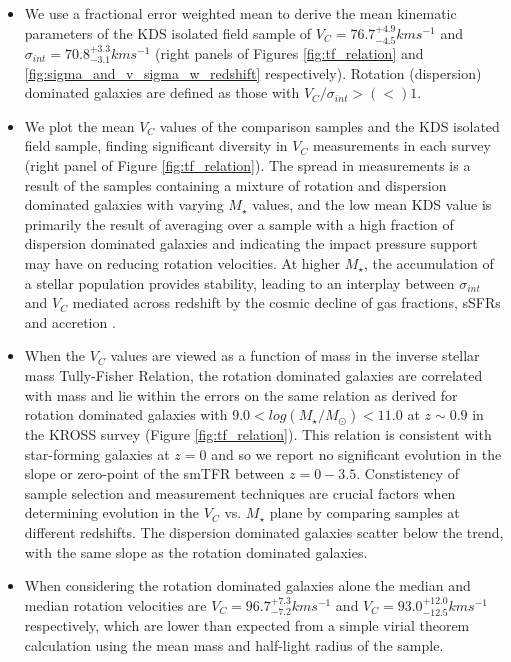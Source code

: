 \documentclass[fleqn,usenatbib]{mn2e}
\begin{document}
\begin{itemize}
    \item We use a fractional error weighted mean to derive the mean kinematic parameters of the KDS isolated field sample of $V_{C} = 76.7^{+4.9}_{-4.5}kms^{-1}$ and $\sigma_{int} = 70.8^{+3.3}_{-3.1} kms^{-1}$ (right panels of Figures \ref{fig:tf_relation} and \ref{fig:sigma_and_v_sigma_w_redshift} respectively).
    Rotation (dispersion) dominated galaxies are defined as those with $V_{C}/\sigma_{int} > (<) 1$.  
    \item We plot the mean $V_{C}$ values of the comparison samples and the KDS isolated field sample, finding significant diversity in $V_{C}$ measurements in each survey (right panel of Figure \ref{fig:tf_relation}).
    The spread in measurements is a result of the samples containing a mixture of rotation and dispersion dominated galaxies with varying $M_{\star}$ values, and the low mean KDS value is primarily the result of averaging over a sample with a high fraction of dispersion dominated galaxies and indicating the impact pressure support may have on reducing rotation velocities.
    At higher $M_{\star}$, the accumulation of a stellar population provides stability, leading to an interplay between $\sigma_{int}$ and $V_{C}$ mediated across redshift by the cosmic decline of gas fractions, sSFRs and accretion \citep[e.g.][]{Law2012b,Wisnioski2015}.
    \item When the $V_{C}$ values are viewed as a function of mass in the inverse stellar mass Tully-Fisher Relation, the rotation dominated galaxies are correlated with mass and lie within the errors on the same relation as derived for rotation dominated galaxies with $9.0 < log(M_{\star}/M_{\odot}) < 11.0$ at $z\sim0.9$ in the KROSS survey (Figure \ref{fig:tf_relation}). %
    This relation is consistent with star-forming galaxies at $z=0$ and so we report no significant evolution in the slope or zero-point of the smTFR between $z=0-3.5$.
    Constistency of sample selection and measurement techniques are crucial factors when determining evolution in the $V_{C}$ vs. $M_{\star}$ plane by comparing samples at different redshifts.
    The dispersion dominated galaxies scatter below the trend, with the same slope as the rotation dominated galaxies.
    \item When considering the rotation dominated galaxies alone the median and median rotation velocities are $V_{C} = 96.7^{+7.3}_{-7.2}kms^{-1}$ and $V_{C} = 93.0^{+12.0}_{-12.5}kms^{-1}$ respectively, which are lower than expected from a simple virial theorem calculation using the mean mass and half-light radius of the sample.

\end{itemize}
\end{document}
